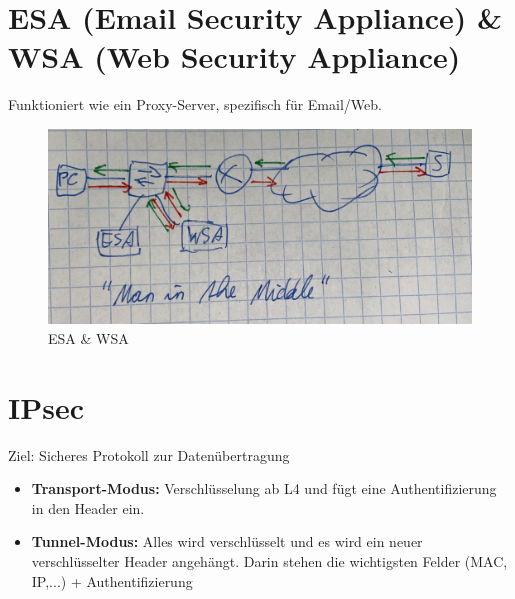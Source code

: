 \section{ESA (Email Security Appliance) \& WSA (Web Security Appliance)}
Funktioniert wie ein Proxy-Server, spezifisch für Email/Web.
\begin{figure}[H]
	\centering
	\includegraphics[width=0.8\linewidth]{figures/esawsa.jpeg}
	\caption{ESA \& WSA}
\end{figure}

\section{IPsec}
Ziel: Sicheres Protokoll zur Datenübertragung
\begin{itemize}
	\item \textbf{Transport-Modus:} Verschlüsselung ab L4 und fügt eine Authentifizierung in den Header ein.
	\item \textbf{Tunnel-Modus:} Alles wird verschlüsselt und es wird ein neuer verschlüsselter Header angehängt. Darin stehen die wichtigsten Felder (MAC, IP,...) + Authentifizierung
\end{itemize}